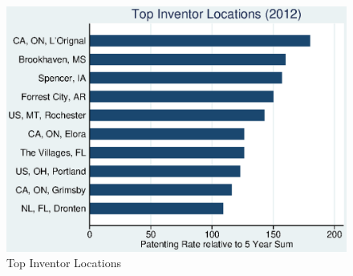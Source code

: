 \documentclass[12pt]{article}
\begin{document}
\begin{figure}[h]
\begin{centering}
  \includegraphics{r52012top10}
  \caption{Top Inventor Locations}
  \label{fig:r52012top10}
\end{centering}
\end{figure}



\newpage
\end{document}
